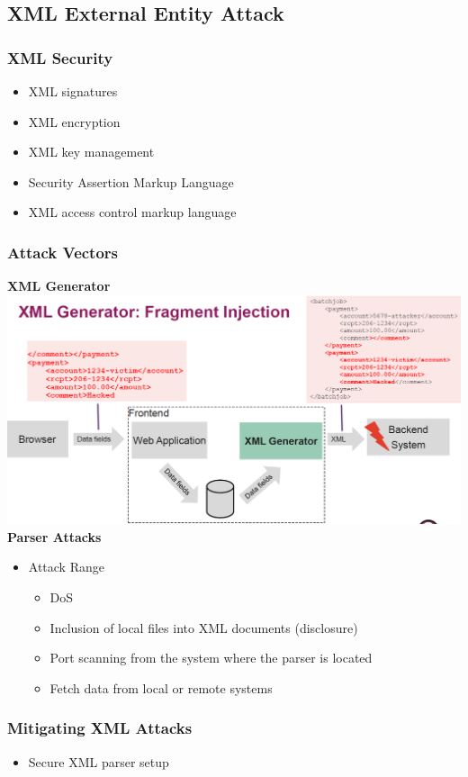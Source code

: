 \subsection{XML External Entity Attack}
\subsubsection{XML Security}
\begin{itemize}
    \item XML signatures
    \item XML encryption
    \item XML key management
    \item Security Assertion Markup Language
    \item XML access control markup language
\end{itemize}

\subsubsection{Attack Vectors}
\textbf{XML Generator}\\
\includegraphics[width=\linewidth]{../img/xml_generator.png}
\textbf{Parser Attacks}
\begin{itemize}
    \item Attack Range
    \begin{itemize}
        \item DoS
        \item Inclusion of local files into XML documents (disclosure)
        \item Port scanning from the system where the parser is located
        \item Fetch data from local or remote systems
    \end{itemize}
\end{itemize}

\subsubsection{Mitigating XML Attacks}
\begin{itemize}
    \item Secure XML parser setup
\end{itemize}